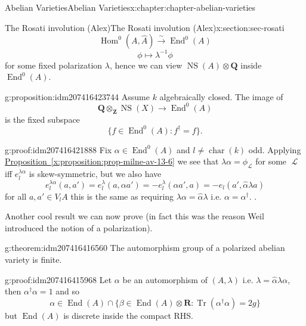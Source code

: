 \documentclass[oneside,10pt,]{book}
\numberwithin{equation}{section}
\newcommand{\sheaf}[1]{\operatorname{\mathcal{#1}}}
\newcommand{\inv}{^{-1}}
\newcommand{\ZZ}{\mathbf{Z}}
\newcommand{\QQ}{\mathbf{Q}}
\newcommand{\RR}{\mathbf{R}}
\DeclareMathOperator{\End}{End}
\DeclareMathOperator{\Hom}{Hom}
\DeclareMathOperator{\characteristic}{char}
\DeclareMathOperator{\trace}{Tr}
\DeclareMathOperator{\NS}{NS}
\begin{document}
\begin{chapterptx}{Abelian Varieties}{}{Abelian Varieties}{}{}{x:chapter:chapter-abelian-varieties}
\begin{sectionptx}{The Rosati involution (Alex)}{}{The Rosati involution (Alex)}{}{}{x:section:sec-rosati}
\begin{equation*}
\Hom^0(A, \hat A) \xrightarrow{\sim} \End^0(A)
\end{equation*}
%
\begin{equation*}
\phi \mapsto \lambda\inv \phi
\end{equation*}
for some fixed polarization \(\lambda\), hence we can view \(\NS(A)\otimes \QQ\) inside \(\End^0(A)\).%
\begin{proposition}{}{}{g:proposition:idm207416423744}%
Assume \(k\) algebraically closed. The image of%
\begin{equation*}
\QQ \otimes_\ZZ \NS(X) \to \End^0(A)
\end{equation*}
is the fixed subspace%
\begin{equation*}
\{f \in \End^0(A) : f^\dagger = f\}\text{.}
\end{equation*}
%
\end{proposition}
\begin{proofptx}{}{g:proof:idm207416421888}
Fix \(\alpha \in \End^0(A)\) and \(l\ne \characteristic(k)\) odd. Applying \hyperref[x:proposition:prop-milne-av-13-6]{Proposition~\ref{x:proposition:prop-milne-av-13-6}} we see that \(\lambda \alpha = \phi_{\sheaf L}\) for some \(\sheaf L\) iff \(e^{\lambda\alpha}_l\) is skew-symmetric, but we also have%
\begin{equation*}
e_l^{\lambda\alpha}(a,a')=  e_l^{\lambda}(a,\alpha a') = -e_l^\lambda(\alpha a',a) = -e_l(a', \hat\alpha \lambda a)
\end{equation*}
for all \(a,a' \in V_lA\) this is the same as requiring \(\lambda\alpha = \hat \alpha \lambda\) i.e. \(\alpha = \alpha^\dagger\). .%
\end{proofptx}
Another cool result we can now prove (in fact this was the reason Weil introduced the notion of a polarization).%
\begin{theorem}{}{}{g:theorem:idm207416416560}%
The automorphism group of a polarized abelian variety is finite.%
\end{theorem}
\begin{proofptx}{}{g:proof:idm207416415968}
Let \(\alpha\) be an automorphism of \((A, \lambda)\) i.e. \(\lambda =\hat \alpha  \lambda \alpha\), then \(\alpha^\dagger \alpha= 1\) and so%
\begin{equation*}
\alpha \in \End(A)\cap \{\beta \in \End(A) \otimes \RR: \trace(\alpha^\dagger \alpha) = 2g\}
\end{equation*}
but \(\End(A)\) is discrete inside the compact RHS.%
\end{proofptx}
\end{sectionptx}

\end{chapterptx}
\end{document}
